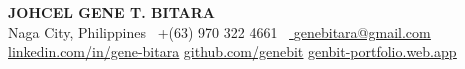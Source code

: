\begin{center}
    \textbf{\Huge \scshape JOHCEL GENE T. BITARA} \\ \vspace{1pt}
    \small Naga City, Philippines \textbar \  +(63) 970 322 4661 \textbar \
    \href{mailto:genebitara@gmail.com}{
        \underline{genebitara@gmail.com}} \\ \vspace{1pt}
    \href{https://www.linkedin.com/in/gene-bitara}{
         \underline{linkedin.com/in/gene-bitara}} \quad
    \href{https://github.com/genebit}{
         \underline{github.com/genebit}} \quad
    \href{http://genbit-portfolio.web.app}{
         \underline{genbit-portfolio.web.app}} \quad
\end{center}